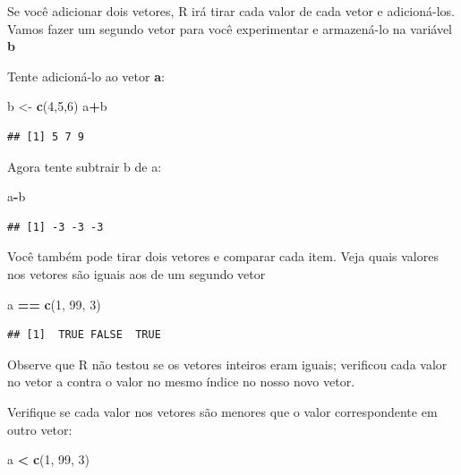 \documentclass[]{book}
\newenvironment{Shaded}{\begin{snugshade}}{\end{snugshade}}
\newcommand{\DecValTok}[1]{\textcolor[rgb]{0.00,0.00,0.81}{#1}}
\newcommand{\KeywordTok}[1]{\textcolor[rgb]{0.13,0.29,0.53}{\textbf{#1}}}
\newcommand{\NormalTok}[1]{#1}
\newcommand{\OperatorTok}[1]{\textcolor[rgb]{0.81,0.36,0.00}{\textbf{#1}}}
\newcommand{\StringTok}[1]{\textcolor[rgb]{0.31,0.60,0.02}{#1}}
\begin{document}
Se você adicionar dois vetores, R irá tirar cada valor de cada vetor e adicioná-los. Vamos fazer um segundo vetor para você experimentar e armazená-lo na variável \textbf{b}

Tente adicioná-lo ao vetor \textbf{a}:

\begin{Shaded}
\begin{Highlighting}[]
\NormalTok{b <-}\StringTok{ }\KeywordTok{c}\NormalTok{(}\DecValTok{4}\NormalTok{,}\DecValTok{5}\NormalTok{,}\DecValTok{6}\NormalTok{)}
\NormalTok{a}\OperatorTok{+}\NormalTok{b}
\end{Highlighting}
\end{Shaded}

\begin{verbatim}
## [1] 5 7 9
\end{verbatim}

Agora tente subtrair b de a:

\begin{Shaded}
\begin{Highlighting}[]
\NormalTok{a}\OperatorTok{-}\NormalTok{b}
\end{Highlighting}
\end{Shaded}

\begin{verbatim}
## [1] -3 -3 -3
\end{verbatim}

Você também pode tirar dois vetores e comparar cada item. Veja quais valores nos vetores são iguais aos de um segundo vetor

\begin{Shaded}
\begin{Highlighting}[]
\NormalTok{a }\OperatorTok{==}\StringTok{ }\KeywordTok{c}\NormalTok{(}\DecValTok{1}\NormalTok{, }\DecValTok{99}\NormalTok{, }\DecValTok{3}\NormalTok{)}
\end{Highlighting}
\end{Shaded}

\begin{verbatim}
## [1]  TRUE FALSE  TRUE
\end{verbatim}

Observe que R não testou se os vetores inteiros eram iguais; verificou cada valor no vetor a contra o valor no mesmo índice no nosso novo vetor.

Verifique se cada valor nos vetores são menores que o valor correspondente em outro vetor:

\begin{Shaded}
\begin{Highlighting}[]
\NormalTok{a }\OperatorTok{<}\StringTok{ }\KeywordTok{c}\NormalTok{(}\DecValTok{1}\NormalTok{, }\DecValTok{99}\NormalTok{, }\DecValTok{3}\NormalTok{)}
\end{Highlighting}
\end{Shaded}
\end{document}
